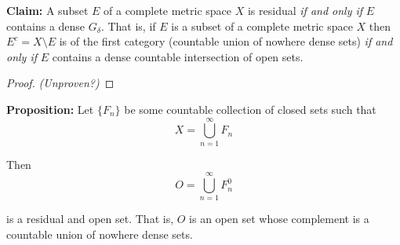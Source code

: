\documentclass[12pt]{article}
\begin{document}
%
%
{\bf Claim:} A subset $E$ of a complete metric space $X$ is residual {\em if and only if} $E$ contains a dense $G_\delta$. That is, if $E$ is a subset of a complete metric space $X$ then $E^c = X\setminus E$ is of the first category (countable union of nowhere dense sets) {\em if and only if} $E$ contains a dense countable intersection of open sets.

\begin{proof} {\em (Unproven?)}
\end{proof}

%
%
{\bf Proposition:} Let $\{F_n\}$ be some countable collection of closed sets such that
\begin{equation*}
	X = \bigcup^\infty_{n = 1} F_n
\end{equation*}

Then 
\begin{equation*}
	O = \bigcup^\infty_{n = 1} F^0_n
\end{equation*}

is a residual and open set. That is, $O$ is an open set whose complement is a countable union of nowhere dense sets.
\end{document}
